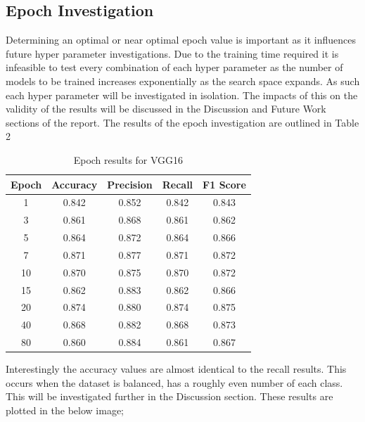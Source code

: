 \documentclass[10pt,twocolumn,letterpaper]{article}
\begin{document}
\subsection{Epoch Investigation}
Determining an optimal or near optimal epoch value is important as it influences future 
hyper parameter investigations. Due to the training time required it is infeasible to 
test every combination of each hyper parameter as the number of models to be trained 
increases exponentially as the search space expands. As such each hyper parameter will 
be investigated in isolation. The impacts of this on the validity of the results will be 
discussed in the Discussion and Future Work sections of the report. The results of the 
epoch investigation are outlined in Table 2
\begin{table}[H]
   \begin{center}
      \label{vgg16epochinvestigation}
      \begin{tabular}{||c c c c c||} 
       \hline
       Epoch & Accuracy & Precision & Recall& F1 Score \\  
       \hline\hline
       1 & 0.842  & 0.852 & 0.842 & 0.843 \\ 
       \hline
       3 & 0.861  &  0.868& 0.861 & 0.862\\
       \hline
       5 & 0.864  &0.872 & 0.864 & 0.866\\
       \hline
       7 & 0.871 & 0.877 & 0.871 & 0.872 \\
       \hline
       10 & 0.870 & 0.875 & 0.870 & 0.872 \\
       \hline
       15 & 0.862 & 0.883 & 0.862 & 0.866 \\
       \hline
       20 & 0.874 & 0.880 & 0.874 & 0.875 \\
       \hline
       40 & 0.868 & 0.882 & 0.868 & 0.873 \\
       \hline
       80 & 0.860 & 0.884 & 0.861 & 0.867 \\
       \hline
      \end{tabular}
      \caption{Epoch results for VGG16}
   \end{center}
   \end{table}
Interestingly the accuracy values are almost identical to the recall results. This occurs 
when the dataset is balanced, has a roughly even number of each class. This will be investigated 
further in the Discussion section. These results are plotted in the below image;
\end{document}
